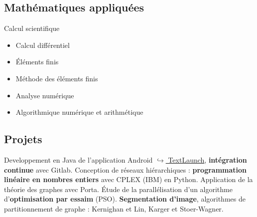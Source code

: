 \documentclass[10pt,a4paper,sans]{moderncv}%
\begin{document}
\subsection{Mathématiques appliquées}
{Calcul scientifique}{
    \begin{itemize}
        \item Calcul différentiel
        \item Éléments finis
        \item Méthode des éléments finis
        \item Analyse numérique
        \item Algorithmique numérique et arithmétique
    \end{itemize}
}

\subsection{Projets}
    {Developpement en Java de l'application Android \href{https://gitlab.com/MisterFruits/TextLaunch}{$\hookrightarrow$ TextLaunch}, \textbf{intégration continue} avec Gitlab.}
    {Conception de réseaux hiérarchiques : \textbf{programmation linéaire en nombres entiers} avec CPLEX (IBM) en Python. Application de la théorie des graphes avec Porta.}
    {Étude de la parallélisation d'un algorithme d'\textbf{optimisation par essaim} (PSO).}
    {\textbf{Segmentation d'image}, algorithmes de partitionnement de graphe : Kernighan et Lin, Karger et Stoer-Wagner.}
\end{document}
